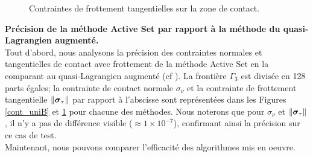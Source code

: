 \begin{figure}[ht!]
	\begin{center}
	\end{center}
	\caption{Contraintes de frottement tangentielles sur la zone de contact.}
	\label{cont_frotB}
\end{figure}

\noindent\textbf{Précision de la méthode Active Set par rapport à la méthode du quasi-Lagrangien augmenté.}\\

Tout d'abord, nous analysons la précision des contraintes normales et tangentielles de contact avec frottement de la méthode Active Set en la comparant au quasi-Lagrangien augmenté (cf \cite{alart1991mixed}). La frontière $\Gamma_3$ est divisée en 128 parts égales; la contrainte de contact normale $\sigma_{\nu}$ et la contrainte de frottement tangentielle $\|\mbox{\boldmath{$\sigma$}}_{\tau}\|$ par rapport à l'abscisse sont représentées dans les Figures \ref{cont_uniB} et \ref{cont_frotB} pour chacune des méthodes. Nous noterons que pour $\sigma_{\nu}$ et $\|\mbox{\boldmath{$\sigma$}}_{\tau}\|$, il n'y a pas de différence visible ($\approx 1\times10^{-7}$), confirmant ainsi la précision sur ce cas de test.\\
Maintenant, nous pouvons comparer l'efficacité des algorithmes mis en oeuvre.\\

